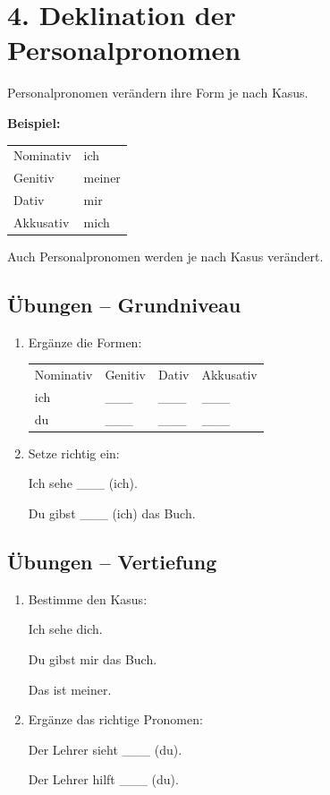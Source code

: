 \documentclass[a4paper,12pt]{article}
\begin{document}
\section*{4. Deklination der Personalpronomen}

Personalpronomen verändern ihre Form je nach Kasus.

\textbf{Beispiel:}

\begin{tabular}{ll}
Nominativ & ich \\
Genitiv & meiner \\
Dativ & mir \\
Akkusativ & mich \\
\end{tabular}

\begin{merksatz}
Auch Personalpronomen werden je nach Kasus verändert.
\end{merksatz}

\subsection*{Übungen – Grundniveau}

\begin{enumerate}
\item Ergänze die Formen:

\begin{tabular}{llll}
Nominativ & Genitiv & Dativ & Akkusativ \\
ich & \_\_\_ & \_\_\_ & \_\_\_ \\
du & \_\_\_ & \_\_\_ & \_\_\_ \\
\end{tabular}

\item Setze richtig ein:

Ich sehe \_\_\_ (ich).

Du gibst \_\_\_ (ich) das Buch.
\end{enumerate}

\subsection*{Übungen – Vertiefung}

\begin{enumerate}
\item Bestimme den Kasus:

Ich sehe dich.

Du gibst mir das Buch.

Das ist meiner.

\item Ergänze das richtige Pronomen:

Der Lehrer sieht \_\_\_ (du).

Der Lehrer hilft \_\_\_ (du).
\end{enumerate}
\end{document}
